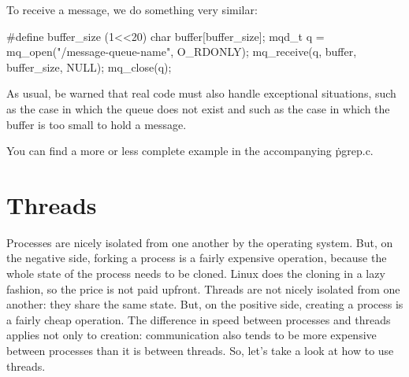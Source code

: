 To receive a message, we do something very similar:
\begin{ccode}
#define buffer_size (1<<20)
char buffer[buffer_size];
mqd_t q = mq_open("/message-queue-name", O_RDONLY);
mq_receive(q, buffer, buffer_size, NULL);
mq_close(q);
\end{ccode}
As usual, be warned that real code must also handle exceptional situations,
  such as the case in which the queue does not exist
  and such as the case in which the buffer is too small to hold a message.

\medskip

You can find a more or less complete example in the accompanying \.{pgrep.c}.


\section*{Threads}

Processes are nicely isolated from one another by the operating system.
But, on the negative side, forking a process is a fairly expensive operation,
  because the whole state of the process needs to be cloned.
Linux does the cloning in a lazy fashion, so the price is not paid upfront.
Threads are not nicely isolated from one another: they share the same state.
But, on the positive side, creating a process is a fairly cheap operation.
The difference in speed between processes and threads applies not only to creation:
  communication also tends to be more expensive between processes
  than it is between threads.
So, let's take a look at how to use threads.

